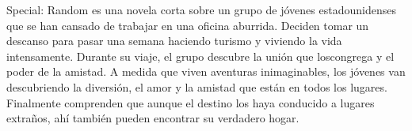 
Special: Random es una novela corta sobre un grupo de jóvenes estadounidenses que se han cansado de trabajar en una oficina aburrida. Deciden tomar un descanso para pasar una semana haciendo turismo y viviendo la vida intensamente. Durante su viaje, el grupo descubre la unión que loscongrega y el poder de la amistad. A medida que viven aventuras inimaginables, los jóvenes van descubriendo la diversión, el amor y la amistad que están en todos los lugares. Finalmente comprenden que aunque el destino los haya conducido a lugares extraños, ahí también pueden encontrar su verdadero hogar.
